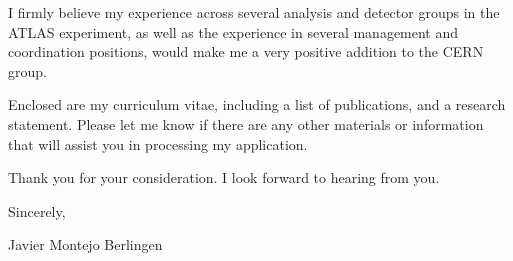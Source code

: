 \documentclass[11pt,a4paper,sans]{moderncv}        %
\begin{document}
I firmly believe my experience across several analysis and detector groups in the ATLAS experiment, as well as the experience in several management and coordination positions, would make me a very positive addition to the CERN group. 
\newline

Enclosed are my curriculum vitae, including a list of publications, and a research
statement. Please let me know if there are any other materials or information that will assist you in
processing my application.
\newline

Thank you for your consideration. I look forward to hearing from you.
\newline

Sincerely,

\vfill
Javier Montejo Berlingen
\clearpage

\end{document}

